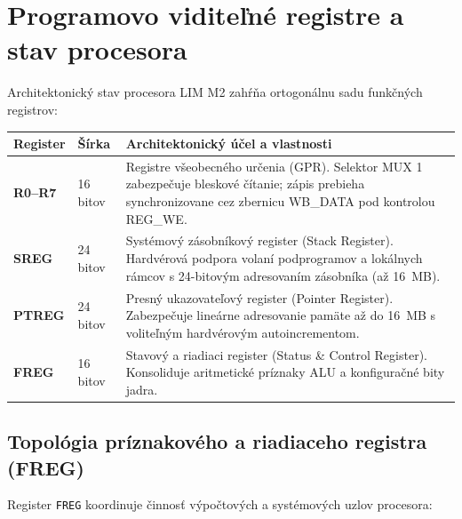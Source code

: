 \documentclass[11pt,a4paper]{article}
\newcommand{\reg}[1]{\texttt{#1}}
\begin{document}
\section{Programovo viditeľné registre a stav procesora}
Architektonický stav procesora LIM M2 zahŕňa ortogonálnu sadu funkčných registrov:

\begin{longtable}{>{\ttfamily\bfseries}p{25mm}p{28mm}p{93mm}}
\toprule
Register & Šírka & Architektonický účel a vlastnosti \\
\midrule\endhead
R0--R7 & 16 bitov & Registre všeobecného určenia (GPR). Selektor MUX 1 zabezpečuje bleskové čítanie; zápis prebieha synchronizovane cez zbernicu WB\_DATA pod kontrolou REG\_WE. \\
SREG & 24 bitov & Systémový zásobníkový register (Stack Register). Hardvérová podpora volaní podprogramov a lokálnych rámcov s 24-bitovým adresovaním zásobníka (až 16~MB). \\
PTREG & 24 bitov & Presný ukazovateľový register (Pointer Register). Zabezpečuje lineárne adresovanie pamäte až do 16~MB s voliteľným hardvérovým autoincrementom. \\
FREG & 16 bitov & Stavový a riadiaci register (Status \& Control Register). Konsoliduje aritmetické príznaky ALU a konfiguračné bity jadra. \\
\bottomrule
\end{longtable}

\subsection{Topológia príznakového a riadiaceho registra (FREG)}
Register \reg{FREG} koordinuje činnosť výpočtových a systémových uzlov procesora:
\end{document}
